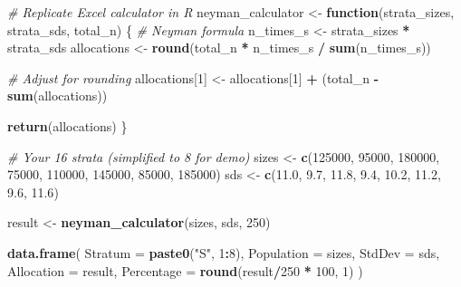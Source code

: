 \documentclass[
]{article}
\newenvironment{Shaded}{\begin{snugshade}}{\end{snugshade}}
\newcommand{\AttributeTok}[1]{\textcolor[rgb]{0.13,0.29,0.53}{#1}}
\newcommand{\CommentTok}[1]{\textcolor[rgb]{0.56,0.35,0.01}{\textit{#1}}}
\newcommand{\ControlFlowTok}[1]{\textcolor[rgb]{0.13,0.29,0.53}{\textbf{#1}}}
\newcommand{\DecValTok}[1]{\textcolor[rgb]{0.00,0.00,0.81}{#1}}
\newcommand{\FloatTok}[1]{\textcolor[rgb]{0.00,0.00,0.81}{#1}}
\newcommand{\FunctionTok}[1]{\textcolor[rgb]{0.13,0.29,0.53}{\textbf{#1}}}
\newcommand{\NormalTok}[1]{#1}
\newcommand{\OtherTok}[1]{\textcolor[rgb]{0.56,0.35,0.01}{#1}}
\newcommand{\SpecialCharTok}[1]{\textcolor[rgb]{0.81,0.36,0.00}{\textbf{#1}}}
\newcommand{\StringTok}[1]{\textcolor[rgb]{0.31,0.60,0.02}{#1}}
\begin{document}
\begin{Shaded}
\begin{Highlighting}[]
\CommentTok{\# Replicate Excel calculator in R}
\NormalTok{neyman\_calculator }\OtherTok{\textless{}{-}} \ControlFlowTok{function}\NormalTok{(strata\_sizes, strata\_sds, total\_n) \{}
  \CommentTok{\# Neyman formula}
\NormalTok{  n\_times\_s }\OtherTok{\textless{}{-}}\NormalTok{ strata\_sizes }\SpecialCharTok{*}\NormalTok{ strata\_sds}
\NormalTok{  allocations }\OtherTok{\textless{}{-}} \FunctionTok{round}\NormalTok{(total\_n }\SpecialCharTok{*}\NormalTok{ n\_times\_s }\SpecialCharTok{/} \FunctionTok{sum}\NormalTok{(n\_times\_s))}
  
  \CommentTok{\# Adjust for rounding}
\NormalTok{  allocations[}\DecValTok{1}\NormalTok{] }\OtherTok{\textless{}{-}}\NormalTok{ allocations[}\DecValTok{1}\NormalTok{] }\SpecialCharTok{+}\NormalTok{ (total\_n }\SpecialCharTok{{-}} \FunctionTok{sum}\NormalTok{(allocations))}
  
  \FunctionTok{return}\NormalTok{(allocations)}
\NormalTok{\}}

\CommentTok{\# Your 16 strata (simplified to 8 for demo)}
\NormalTok{sizes }\OtherTok{\textless{}{-}} \FunctionTok{c}\NormalTok{(}\DecValTok{125000}\NormalTok{, }\DecValTok{95000}\NormalTok{, }\DecValTok{180000}\NormalTok{, }\DecValTok{75000}\NormalTok{, }\DecValTok{110000}\NormalTok{, }\DecValTok{145000}\NormalTok{, }\DecValTok{85000}\NormalTok{, }\DecValTok{185000}\NormalTok{)}
\NormalTok{sds }\OtherTok{\textless{}{-}} \FunctionTok{c}\NormalTok{(}\FloatTok{11.0}\NormalTok{, }\FloatTok{9.7}\NormalTok{, }\FloatTok{11.8}\NormalTok{, }\FloatTok{9.4}\NormalTok{, }\FloatTok{10.2}\NormalTok{, }\FloatTok{11.2}\NormalTok{, }\FloatTok{9.6}\NormalTok{, }\FloatTok{11.6}\NormalTok{)}

\NormalTok{result }\OtherTok{\textless{}{-}} \FunctionTok{neyman\_calculator}\NormalTok{(sizes, sds, }\DecValTok{250}\NormalTok{)}

\FunctionTok{data.frame}\NormalTok{(}
  \AttributeTok{Stratum =} \FunctionTok{paste0}\NormalTok{(}\StringTok{"S"}\NormalTok{, }\DecValTok{1}\SpecialCharTok{:}\DecValTok{8}\NormalTok{),}
  \AttributeTok{Population =}\NormalTok{ sizes,}
  \AttributeTok{StdDev =}\NormalTok{ sds,}
  \AttributeTok{Allocation =}\NormalTok{ result,}
  \AttributeTok{Percentage =} \FunctionTok{round}\NormalTok{(result}\SpecialCharTok{/}\DecValTok{250} \SpecialCharTok{*} \DecValTok{100}\NormalTok{, }\DecValTok{1}\NormalTok{)}
\NormalTok{)}
\end{Highlighting}
\end{Shaded}
\end{document}
